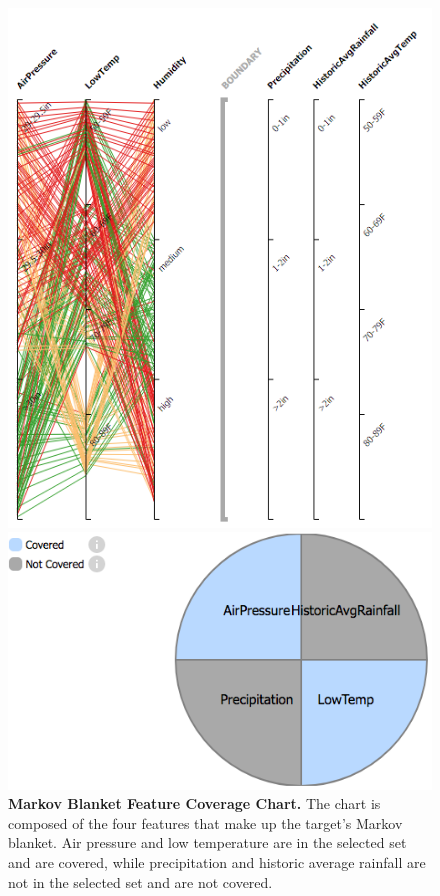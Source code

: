 \begin{figure}[!htbp]
    \centering
    \begin{minipage}{0.5\textwidth}
        \centering
        \includegraphics[width=1\textwidth]{SelectedFeaturesCoverage}
    \end{minipage}\hfill
    \begin{minipage}{0.5\textwidth}
        \centering
        \includegraphics[width=1\textwidth]{CoverageChart}
    \end{minipage}
    \caption{\textbf{Markov Blanket Feature Coverage Chart.} The chart is composed of the four features that make up the target's Markov blanket. Air pressure and low temperature are in the selected set and are covered, while precipitation and historic average rainfall are not in the selected set and are not covered. } \label{fig:CoverageChart}
\end{figure}

